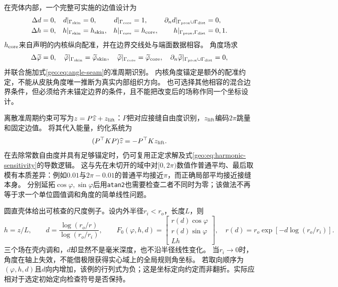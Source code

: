 \documentclass[11pt,a4paper]{article}
\numberwithin{equation}{section}
\theoremstyle{definition}
\begin{document}
在壳体内部，一个完整可实施的边值设计为
\begin{align}
 \Delta d&=0,
 &d|_{\Gamma_{\rm skin}}&=0,
 &d|_{\Gamma_{\rm core}}&=1,
 &\partial_n d|_{\Gamma_{\rm prox}\cup\Gamma_{\rm dist}}&=0,
 \label{geo:eq:volume-depth-pde}\\
 \Delta h&=0,
 &h|_{\Gamma_{\rm skin}}&=h_{\rm skin},
 &h|_{\Gamma_{\rm core}}&=h_{\rm core},
 &h|_{\Gamma_{\rm prox},\Gamma_{\rm dist}}&=0,1.
 \label{geo:eq:volume-height-pde}
\end{align}
$h_{\rm core}$来自声明的内核纵向配准，并在边界交线处与端面数据相容。
角度场求
\begin{equation}
 \Delta\widetilde\varphi=0,\quad
 \widetilde\varphi|_{\Gamma_{\rm skin}}=\widetilde\varphi_{\rm skin},\quad
 \widetilde\varphi|_{\Gamma_{\rm core}}=\widetilde\varphi_{\rm core},
 \quad\partial_n\widetilde\varphi|_{\Gamma_{\rm prox}\cup\Gamma_{\rm dist}}=0,
 \label{geo:eq:volume-angle-pde}
\end{equation}
并联合施加式\eqref{geo:eq:angle-seam}的准周期识别。
内核角度锚定是额外的配准约定，不能从皮肤角度唯一推断为真实内部组织方向。
也可选择其他相容的混合边界条件，但必须给齐未锚定边界的条件，且不能把改变后的场称作同一个坐标设计。

离散准周期约束可写为$z=P\widehat z+z_{\rm lift}$：$P$把对应接缝自由度识别，$z_{\rm lift}$编码$2\pi$跳量和固定边值。
将其代入能量，约化系统为
\begin{equation}
 (P^{\top}KP)\widehat z=-P^{\top}Kz_{\rm lift}.
 \label{geo:eq:periodic-fem}
\end{equation}
在去除常数自由度并具有足够锚定时，仍可复用正定求解及式\eqref{geo:eq:harmonic-sensitivity}的导数逻辑。
这与先在未切开的域中对$[0,2\pi)$数值作普通平均、最后取模有本质差异：例如$0.01$与$2\pi-0.01$的普通平均接近$\pi$，而正确局部平均接近接缝本身。
分别延拓$\cos\varphi,\sin\varphi$后用\texttt{atan2}也需要检查二者不同时为零；该做法不再等于求一个单位圆值调和角度的简单线性问题。

圆直壳体给出可核查的尺度例子。设内外半径$r_i<r_o$，长度$L$，则
\begin{equation}
 h=z/L,\qquad
 d=\frac{\log(r_o/r)}{\log(r_o/r_i)},\qquad
 F_0(\varphi,h,d)=
 \begin{bmatrix}r(d)\cos\varphi\\r(d)\sin\varphi\\Lh\end{bmatrix},
 \quad r(d)=r_o\exp[-d\log(r_o/r_i)].
 \label{geo:eq:cylinder-example}
\end{equation}
三个场在壳内调和，$d$却显然不是毫米深度，也不沿半径线性变化。
当$r_i\to0$时，角度在轴上失效，不能借极限获得实心域上的全局规则角坐标。
若取向顺序为$(\varphi,h,d)$且$d$向内增加，该例的行列式为负；这是坐标定向约定而非翻折。实际应相对于选定初始定向检查符号是否保持。
\end{document}
